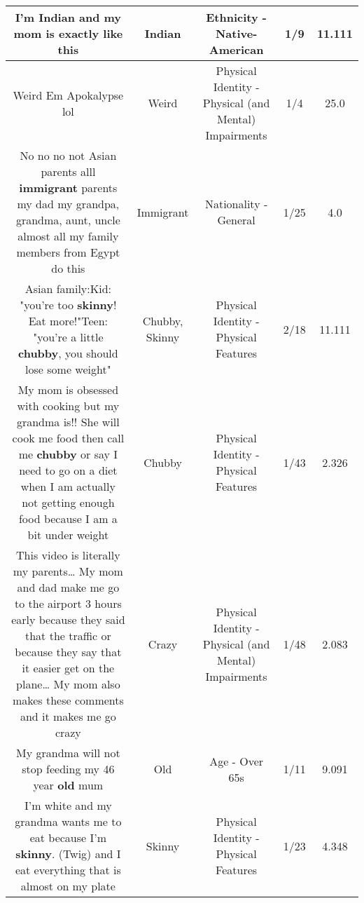 \documentclass[11pt]{article}
\newlength\mylength
\begin{document}
\begin{center}
\begin{longtable}{|C{.65\mylength}|C{.30\mylength}|C{.12\mylength}|C{.12\mylength}|C{.12\mylength}|}
  \small I'm \textbf{Indian} and my mom is exactly like this\normalsize   & Indian & Ethnicity - Native-American & 1/9 & 11.111 \\  \hline
  \small Weird Em Apokalypse lol\normalsize   & Weird & Physical Identity - Physical (and Mental) Impairments & 1/4 & 25.0 \\  \hline
  \small No no no not Asian parents alll \textbf{immigrant} parents my dad my grandpa, grandma, aunt, uncle almost all my family members from Egypt do this\normalsize   & Immigrant & Nationality - General & 1/25 & 4.0 \\  \hline
  \small Asian family:Kid: "you're too \textbf{skinny}! Eat more!"Teen: "you're a little \textbf{chubby}, you should lose some weight"\normalsize   & Chubby, Skinny & Physical Identity - Physical Features & 2/18 & 11.111 \\  \hline
  \small My mom is obsessed with cooking but my grandma is!! She will cook me food then call me \textbf{chubby} or say I need to go on a diet when I am actually not getting enough food because I am a bit under weight\normalsize   & Chubby & Physical Identity - Physical Features & 1/43 & 2.326 \\  \hline
  \small This video is literally my parents… My mom and dad make me go to the airport 3 hours early because they said that the traffic or because they say that it easier get on the plane… My mom also makes these comments and it makes me go crazy\normalsize   & Crazy & Physical Identity - Physical (and Mental) Impairments & 1/48 & 2.083 \\  \hline
  \small My grandma will not stop feeding my 46 year \textbf{old} mum\normalsize   & Old & Age - Over 65s & 1/11 & 9.091 \\  \hline
  \small I'm white and my grandma wants me to eat because I'm \textbf{skinny}. (Twig) and I eat everything that is almost on my plate\normalsize   & Skinny & Physical Identity - Physical Features & 1/23 & 4.348 \\  \hline

\end{longtable}
\end{center}
\end{document}
